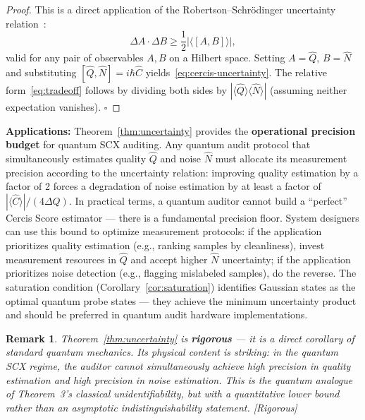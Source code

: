\documentclass[12pt,a4paper]{article}
\newtheorem{remark}[theorem]{Remark}
\newcommand{\rigorous}{\textcolor{green!50!black}{\small\textsf{[Rigorous]}}}
\begin{document}
\begin{proof}
This is a direct application of the Robertson--Schr\"odinger uncertainty
relation~\citep{robertson1929uncertainty}:
\begin{equation}\label{eq:robertson}
    \Delta A \cdot \Delta B \geq
    \frac12|\langle[A,B]\rangle|,
\end{equation}
valid for any pair of observables $A,B$ on a Hilbert space.
Setting $A=\hat{Q}$, $B=\hat{N}$ and substituting
$[\hat{Q},\hat{N}]=i\hbar\hat{C}$ yields~\eqref{eq:cercis-uncertainty}.
The relative form~\eqref{eq:tradeoff} follows by dividing both sides by
$|\langle\hat{Q}\rangle\langle\hat{N}\rangle|$ (assuming neither expectation
vanishes). $\square$
\end{proof}

\medskip\noindent
\textbf{Applications:}
Theorem~\ref{thm:uncertainty} provides the \textbf{operational precision
budget} for quantum SCX auditing.  Any quantum audit protocol that
simultaneously estimates quality $\hat{Q}$ and noise $\hat{N}$ must allocate
its measurement precision according to the uncertainty relation: improving
quality estimation by a factor of 2 forces a degradation of noise estimation
by at least a factor of $|\langle\hat{C}\rangle|/(4\Delta Q)$.  In practical
terms, a quantum auditor cannot build a ``perfect'' Cercis Score estimator —
there is a fundamental precision floor.  System designers can use this bound
to optimize measurement protocols: if the application prioritizes quality
estimation (e.g., ranking samples by cleanliness), invest measurement
resources in $\hat{Q}$ and accept higher $\hat{N}$ uncertainty; if the
application prioritizes noise detection (e.g., flagging mislabeled samples),
do the reverse.  The saturation condition (Corollary~\ref{cor:saturation})
identifies Gaussian states as the optimal quantum probe states — they achieve
the minimum uncertainty product and should be preferred in quantum audit
hardware implementations.

\begin{remark}
Theorem~\ref{thm:uncertainty} is \textbf{rigorous} — it is a direct corollary
of standard quantum mechanics.  Its physical content is striking: in the
quantum SCX regime, the auditor cannot simultaneously achieve high precision
in quality estimation \emph{and} high precision in noise estimation.  This is
the quantum analogue of Theorem~3's classical unidentifiability, but with a
\emph{quantitative lower bound} rather than an asymptotic indistinguishability
statement.  \rigorous
\end{remark}
\end{document}
